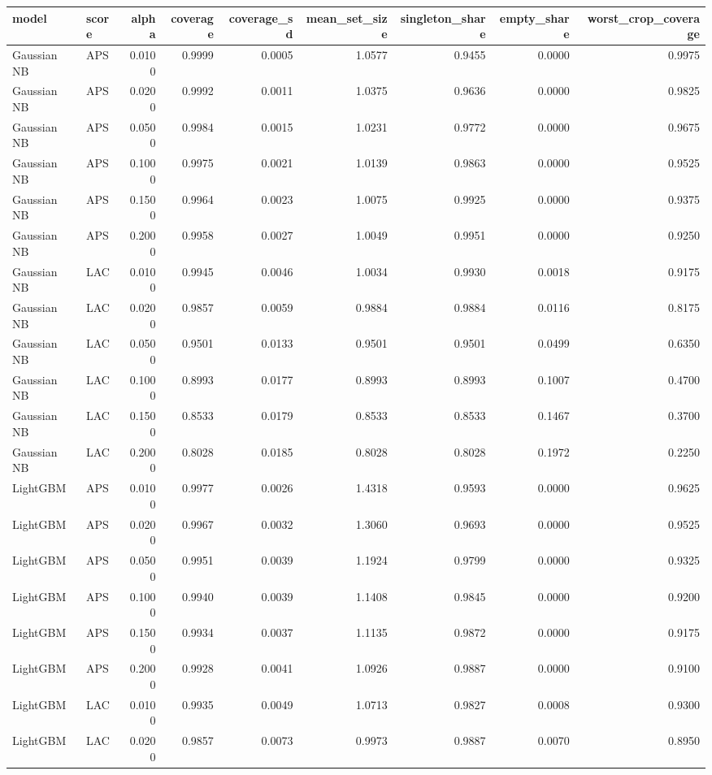 \begin{tabular}{llrrrrrrr}
\toprule
model & score & alpha & coverage & coverage_sd & mean_set_size & singleton_share & empty_share & worst_crop_coverage \\
\midrule
Gaussian NB & APS & 0.0100 & 0.9999 & 0.0005 & 1.0577 & 0.9455 & 0.0000 & 0.9975 \\
Gaussian NB & APS & 0.0200 & 0.9992 & 0.0011 & 1.0375 & 0.9636 & 0.0000 & 0.9825 \\
Gaussian NB & APS & 0.0500 & 0.9984 & 0.0015 & 1.0231 & 0.9772 & 0.0000 & 0.9675 \\
Gaussian NB & APS & 0.1000 & 0.9975 & 0.0021 & 1.0139 & 0.9863 & 0.0000 & 0.9525 \\
Gaussian NB & APS & 0.1500 & 0.9964 & 0.0023 & 1.0075 & 0.9925 & 0.0000 & 0.9375 \\
Gaussian NB & APS & 0.2000 & 0.9958 & 0.0027 & 1.0049 & 0.9951 & 0.0000 & 0.9250 \\
Gaussian NB & LAC & 0.0100 & 0.9945 & 0.0046 & 1.0034 & 0.9930 & 0.0018 & 0.9175 \\
Gaussian NB & LAC & 0.0200 & 0.9857 & 0.0059 & 0.9884 & 0.9884 & 0.0116 & 0.8175 \\
Gaussian NB & LAC & 0.0500 & 0.9501 & 0.0133 & 0.9501 & 0.9501 & 0.0499 & 0.6350 \\
Gaussian NB & LAC & 0.1000 & 0.8993 & 0.0177 & 0.8993 & 0.8993 & 0.1007 & 0.4700 \\
Gaussian NB & LAC & 0.1500 & 0.8533 & 0.0179 & 0.8533 & 0.8533 & 0.1467 & 0.3700 \\
Gaussian NB & LAC & 0.2000 & 0.8028 & 0.0185 & 0.8028 & 0.8028 & 0.1972 & 0.2250 \\
LightGBM & APS & 0.0100 & 0.9977 & 0.0026 & 1.4318 & 0.9593 & 0.0000 & 0.9625 \\
LightGBM & APS & 0.0200 & 0.9967 & 0.0032 & 1.3060 & 0.9693 & 0.0000 & 0.9525 \\
LightGBM & APS & 0.0500 & 0.9951 & 0.0039 & 1.1924 & 0.9799 & 0.0000 & 0.9325 \\
LightGBM & APS & 0.1000 & 0.9940 & 0.0039 & 1.1408 & 0.9845 & 0.0000 & 0.9200 \\
LightGBM & APS & 0.1500 & 0.9934 & 0.0037 & 1.1135 & 0.9872 & 0.0000 & 0.9175 \\
LightGBM & APS & 0.2000 & 0.9928 & 0.0041 & 1.0926 & 0.9887 & 0.0000 & 0.9100 \\
LightGBM & LAC & 0.0100 & 0.9935 & 0.0049 & 1.0713 & 0.9827 & 0.0008 & 0.9300 \\
LightGBM & LAC & 0.0200 & 0.9857 & 0.0073 & 0.9973 & 0.9887 & 0.0070 & 0.8950 \\

\end{tabular}
